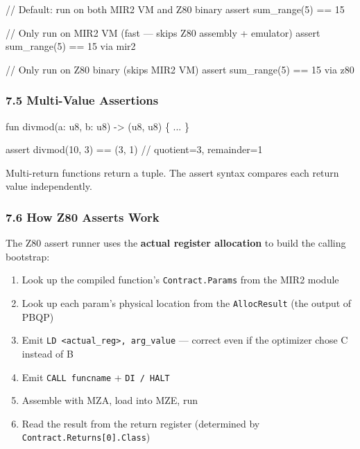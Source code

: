\documentclass[
  11pt,
]{article}
\newenvironment{Shaded}{\begin{snugshade}}{\end{snugshade}}
\newcommand{\NormalTok}[1]{#1}
\providecommand{\tightlist}{%
  \setlength{\itemsep}{0pt}\setlength{\parskip}{0pt}}
\begin{document}
\begin{Shaded}
\begin{Highlighting}[]
\NormalTok{// Default: run on both MIR2 VM and Z80 binary}
\NormalTok{assert sum\_range(5) == 15}

\NormalTok{// Only run on MIR2 VM (fast — skips Z80 assembly + emulator)}
\NormalTok{assert sum\_range(5) == 15 via mir2}

\NormalTok{// Only run on Z80 binary (skips MIR2 VM)}
\NormalTok{assert sum\_range(5) == 15 via z80}
\end{Highlighting}
\end{Shaded}

\hypertarget{multi-value-assertions}{%
\subsubsection{7.5 Multi-Value
Assertions}\label{multi-value-assertions}}

\begin{Shaded}
\begin{Highlighting}[]
\NormalTok{fun divmod(a: u8, b: u8) {-}\textgreater{} (u8, u8) \{ ... \}}

\NormalTok{assert divmod(10, 3) == (3, 1)   // quotient=3, remainder=1}
\end{Highlighting}
\end{Shaded}

Multi-return functions return a tuple. The assert syntax compares each
return value independently.

\hypertarget{how-z80-asserts-work}{%
\subsubsection{7.6 How Z80 Asserts Work}\label{how-z80-asserts-work}}

The Z80 assert runner uses the \textbf{actual register allocation} to
build the calling bootstrap:

\begin{enumerate}
\def\labelenumi{\arabic{enumi}.}
\tightlist
\item
  Look up the compiled function's \texttt{Contract.Params} from the MIR2
  module
\item
  Look up each param's physical location from the \texttt{AllocResult}
  (the output of PBQP)
\item
  Emit \texttt{LD\ \textless{}actual\_reg\textgreater{},\ arg\_value}
  --- correct even if the optimizer chose C instead of B
\item
  Emit \texttt{CALL\ funcname} + \texttt{DI\ /\ HALT}
\item
  Assemble with MZA, load into MZE, run
\item
  Read the result from the return register (determined by
  \texttt{Contract.Returns{[}0{]}.Class})
\end{enumerate}
\end{document}
